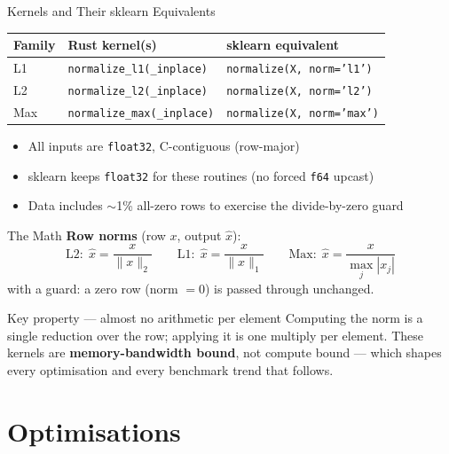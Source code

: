 \documentclass[aspectratio=169]{beamer}
\begin{document}
\begin{frame}{Kernels and Their sklearn Equivalents}
  \begin{center}\small
  \begin{tabular}{lll}
    \hline
    \textbf{Family} & \textbf{Rust kernel(s)} & \textbf{sklearn equivalent} \\
    \hline
    L1  & \texttt{normalize\_l1(\_inplace)}  & \texttt{normalize(X, norm='l1')} \\
    L2  & \texttt{normalize\_l2(\_inplace)}  & \texttt{normalize(X, norm='l2')} \\
    Max & \texttt{normalize\_max(\_inplace)} & \texttt{normalize(X, norm='max')} \\
    \hline
  \end{tabular}
  \end{center}
  \vspace{0.4em}
  \begin{itemize}
    \item All inputs are \texttt{float32}, C-contiguous (row-major)
    \item sklearn keeps \texttt{float32} for these routines (no forced \texttt{f64} upcast)
    \item Data includes $\sim$1\% all-zero rows to exercise the divide-by-zero guard
  \end{itemize}
\end{frame}

\begin{frame}{The Math}
  \textbf{Row norms} (row $x$, output $\hat{x}$):
  \[
    \text{L2:}\ \ \hat{x} = \frac{x}{\|x\|_2}
    \qquad
    \text{L1:}\ \ \hat{x} = \frac{x}{\|x\|_1}
    \qquad
    \text{Max:}\ \ \hat{x} = \frac{x}{\max_j |x_j|}
  \]
  with a guard: a zero row (norm $=0$) is passed through unchanged.
  \vspace{0.8em}
  \begin{alertblock}{Key property — almost no arithmetic per element}
    Computing the norm is a single reduction over the row; applying it is one
    multiply per element. These kernels are \textbf{memory-bandwidth bound}, not
    compute bound --- which shapes every optimisation and every benchmark trend
    that follows.
  \end{alertblock}
\end{frame}

\section{Optimisations}
\end{document}
